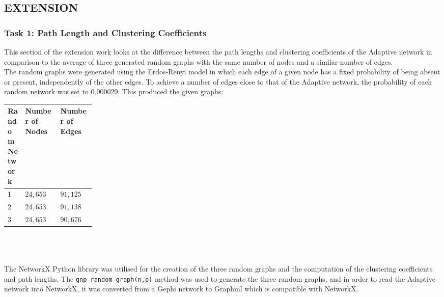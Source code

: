\documentclass[conference]{IEEEtran}
\begin{document}
	\subsection{EXTENSION}		
		\subsubsection{Task 1: Path Length and Clustering Coefficients}
			{
				This section of the extension work looks at the difference between the path lengths and clustering coefficients of the Adaptive network in comparison to the average of three generated random graphs with the same number of nodes and a similar number of edges. \\
 
				The random graphs were generated using the Erdos-Renyi model in which each edge of a given node has a fixed probability of being absent or present, independently of the other edges. To achieve a number of edges close to that of the Adaptive network, the probability of each random network was set to 0.000029. This produced the given graphs: \\
				
			\begin{tabularx}{0.95\linewidth}{| p{0.2\linewidth} | X | X |}
				\hline
				\textbf{Random Network} & \textbf{Number of Nodes} & \textbf{Number of Edges} \\ \hline
				1 & $24,653$ & $91,125$ \\ \hline
				2 & $24,653$ & $91,138$ \\ \hline
				3 & $24,653$ & $90,676$ \\ \hline
			\end{tabularx}
			\\ \\ \\
			The NetworkX Python library \cite{networkx} was utilised for the creation of the three random graphs and the computation of the clustering coefficients and path lengths. The \texttt{gnp\_random\_graph(n,p)} method was used to generate the three random graphs, and in order to read the Adaptive network into NetworkX, it was converted from a Gephi network to Graphml which is compatible with NetworkX.
			\par}
			
\end{document}
